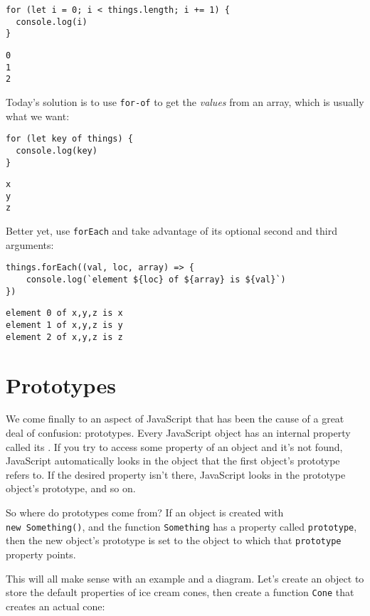 \begin{verbatim}
for (let i = 0; i < things.length; i += 1) {
  console.log(i)
}
\end{verbatim}

\begin{verbatim}
0
1
2
\end{verbatim}

Today's solution is to use \texttt{for-of} to get the \emph{values} from an array,
which is usually what we want:

\begin{verbatim}
for (let key of things) {
  console.log(key)
}
\end{verbatim}

\begin{verbatim}
x
y
z
\end{verbatim}

Better yet, use \texttt{forEach} and take advantage of its optional second and third arguments:

\begin{verbatim}
things.forEach((val, loc, array) => {
    console.log(`element ${loc} of ${array} is ${val}`)
})
\end{verbatim}

\begin{verbatim}
element 0 of x,y,z is x
element 1 of x,y,z is y
element 2 of x,y,z is z
\end{verbatim}

\section{Prototypes}\label{s:legacy-prototypes}

We come finally to an aspect of JavaScript that has been the cause of a great deal of confusion: prototypes.
Every JavaScript object has an internal property called its .
If you try to access some property of an object and it's not found,
JavaScript automatically looks in the object that the first object's prototype refers to.
If the desired property isn't there,
JavaScript looks in the prototype object's prototype, and so on.

So where do prototypes come from?
If an object is created with \texttt{new\ Something()},
and the function \texttt{Something} has a property called \texttt{prototype},
then the new object's prototype is set to the object to which that
\texttt{prototype} property points.

This will all make sense with an example and a diagram.
Let's create an object to store the default properties of ice cream cones,
then create a function \texttt{Cone} that creates an actual cone:

